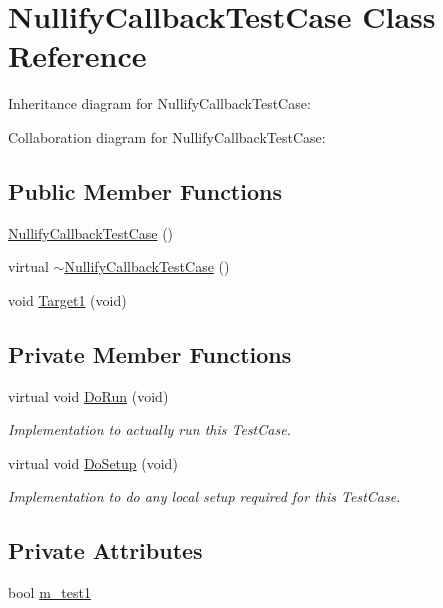 \hypertarget{classNullifyCallbackTestCase}{}\section{Nullify\+Callback\+Test\+Case Class Reference}
\label{classNullifyCallbackTestCase}


Inheritance diagram for Nullify\+Callback\+Test\+Case\+:


Collaboration diagram for Nullify\+Callback\+Test\+Case\+:
\subsection*{Public Member Functions}
\begin{DoxyCompactItemize}
\item 
\hyperlink{classNullifyCallbackTestCase_a2f078109dc84c8765de3a23da7024982}{Nullify\+Callback\+Test\+Case} ()
\item 
virtual \hyperlink{classNullifyCallbackTestCase_a12b197220edf339a6ce0d0a2c74af1cb}{$\sim$\+Nullify\+Callback\+Test\+Case} ()
\item 
void \hyperlink{classNullifyCallbackTestCase_aa5400251f3da6311ea3bf4327fb55c7f}{Target1} (void)
\end{DoxyCompactItemize}
\subsection*{Private Member Functions}
\begin{DoxyCompactItemize}
\item 
virtual void \hyperlink{classNullifyCallbackTestCase_ae20af2bdd79c85be1b075171568c4ecc}{Do\+Run} (void)
\begin{DoxyCompactList}\small\item\em Implementation to actually run this Test\+Case. \end{DoxyCompactList}\item 
virtual void \hyperlink{classNullifyCallbackTestCase_adee685420dae4956a40c16e4e601cfb6}{Do\+Setup} (void)
\begin{DoxyCompactList}\small\item\em Implementation to do any local setup required for this Test\+Case. \end{DoxyCompactList}\end{DoxyCompactItemize}
\subsection*{Private Attributes}
\begin{DoxyCompactItemize}
\item 
bool \hyperlink{classNullifyCallbackTestCase_a62b9da8b806a1d864b7d27d9bc1a26ec}{m\+\_\+test1}
\end{DoxyCompactItemize}
